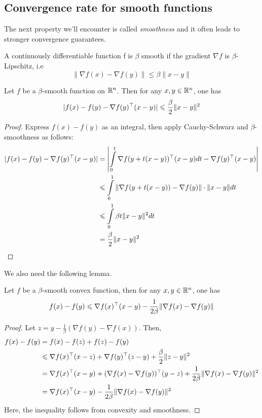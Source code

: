\subsection{Convergence rate for smooth functions}

The next property we'll encounter is called \emph{smoothness} and it often leads
to stronger convergence guarantees.

\begin{definition}
A continuously differentiable function f is $\beta$ smooth if the gradient $\nabla f$ is $\beta$-Lipschitz, i.e
$$\|\nabla f(x) - \nabla f(y)\| \leq \beta\|x-y\|$$
\end{definition}


\begin{lemma}\label{l1}
Let $f$ be a $\beta$-smooth function on $\mathbb{R}^n$.  Then for any $x,y \in \mathbb{R}^n$, one has
$$|f(x) - f(y) - \nabla f(y)^\top(x-y)| \leqslant \frac{\beta}{2}\|x-y\|^2$$
\end{lemma}

\begin{proof}
Express $f(x) - f(y)$ as an integral, then apply Cauchy-Schwarz and 
$\beta$-smoothness as follows:
\begin{align*}
|f(x) - f(y) - \nabla f(y)^\top(x-y)|
&=\left|\int\limits_{0}^1 \nabla f(y + t(x-y))^\top(x-y)dt - \nabla
f(y)^\top(x-y)\right|\\
&\leqslant  \int\limits_{0}^1 \|\nabla f(y + t(x-y)) - \nabla f(y)\|\cdot \|x-y\|dt\\
&\leqslant \int\limits_{0}^1 \beta t\|x-y\|^2dt\\
&= \frac{\beta}{2}\|x-y\|^2\qedhere
\end{align*}
\end{proof}

We also need the following lemma.

\begin{lemma} \label{lm2}
Let $f$ be a $\beta$-smooth convex function, then for any $x,y \in \mathbb{R}^n$, one has
$$f(x) - f(y)\leqslant \nabla f(x)^\top(x-y) - 
\frac{1}{2\beta}\|\nabla f(x) - \nabla f(y)\|$$
\end{lemma}

\begin{proof}
Let $z = y - \frac{1}{\beta}(\nabla f(y) - \nabla f(x))$.  Then,
\begin{align*}
f(x) - f(y)
    &= f(x) - f(z) + f(z) - f(y) \\
    &\leqslant \nabla f(x)^\top(x-z) + \nabla f(y)^\top(z-y) + \frac{\beta}{2}\|z-y\|^2 \\
    &= \nabla f(x)^\top(x-y) + (\nabla f(x) - \nabla f(y))^\top(y-z) + \frac{1}{2\beta}\|\nabla f(x) - \nabla f(y)\|^2 \\
    &= \nabla f(x)^\top(x-y) - \frac{1}{2\beta} \|\nabla f(x) - \nabla f(y)\|^2
\end{align*}
Here, the inequality follows from convexity and smoothness.
\end{proof}


